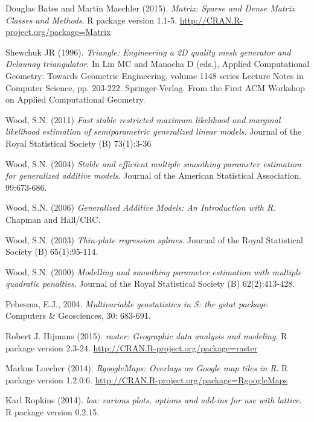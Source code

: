 \documentclass[a4paper,11pt,twoside,openright]{book}							%
\begin{document}
\begin{thebibliography}{99}
Douglas Bates and Martin Maechler (2015). \emph{Matrix: Sparse and Dense Matrix Classes and Methods}. R package version 1.1-5. \href{http://CRAN.R-project.org/package=Matrix}{http://CRAN.R-project.org/package=Matrix}

Shewchuk JR (1996). \emph{Triangle: Engineering a 2D quality mesh generator and Delaunay triangulator}. In Lin MC and Manocha D (eds.), Applied Computational Geometry: Towards Geometric Engineering, volume 1148 series Lecture Notes in Computer Science, pp. 203-222. Springer-Verlag. From the First ACM Workshop on Applied Computational Geometry.

Wood, S.N. (2011) \emph{Fast stable restricted maximum likelihood and marginal likelihood estimation of semiparametric generalized linear models}. Journal of the Royal Statistical Society (B) 73(1):3-36

Wood, S.N. (2004) \emph{Stable and efficient multiple smoothing parameter estimation for generalized additive models}. Journal of the American Statistical Association. 99:673-686.

Wood, S.N. (2006) \emph{Generalized Additive Models: An Introduction with R}. Chapman and Hall/CRC.

Wood, S.N. (2003) \emph{Thin-plate regression splines}. Journal of the Royal Statistical Society (B) 65(1):95-114.
  
Wood, S.N. (2000) \emph{Modelling and smoothing parameter estimation with multiple quadratic penalties}. Journal of the Royal Statistical Society (B) 62(2):413-428.

Pebesma, E.J., 2004. \emph{Multivariable geostatistics in S: the gstat package}. Computers \& Geosciences, 30: 683-691.

Robert J. Hijmans (2015). \emph{raster: Geographic data analysis and modeling}. R package version 2.3-24. \href{http://CRAN.R-project.org/package=raster}{http://CRAN.R-project.org/package=raster}

Markus Loecher (2014). \emph{RgoogleMaps: Overlays on Google map tiles in R}. R package version 1.2.0.6. \href{http://CRAN.R-project.org/package=RgoogleMaps}{http://CRAN.R-project.org/package=RgoogleMaps}
  
Karl Ropkins (2014). \emph{loa: various plots, options and add-ins for use with lattice}. R package version 0.2.15.


\end{thebibliography}
\end{document}
